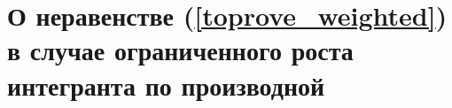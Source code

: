 \chapter{О неравенстве (\ref{toprove_weighted}) в случае ограниченного роста интегранта по производной}
\label{chapt1}





